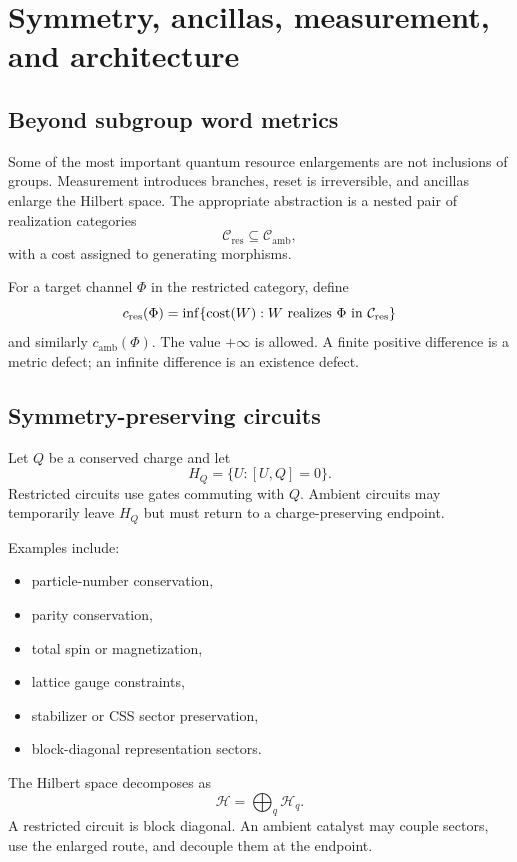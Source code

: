\chapter{Symmetry, ancillas, measurement, and architecture}\label{ch:symmetry-measurement}


\section{Beyond subgroup word metrics}
Some of the most important quantum resource enlargements are not inclusions of groups.  Measurement introduces branches, reset is irreversible, and ancillas enlarge the Hilbert space.  The appropriate abstraction is a nested pair of realization categories
\[
\mathcal C_{\mathrm{res}}
\subseteq
\mathcal C_{\mathrm{amb}},
\]
with a cost assigned to generating morphisms.

For a target channel $\Phi$ in the restricted category, define
\[
c_{\mathrm{res}}(\Phi)
=
\inf\{\operatorname{cost}(W):W\text{ realizes }\Phi\text{ in }\mathcal C_{\mathrm{res}}\}
\]
and similarly $c_{\mathrm{amb}}(\Phi)$.  The value $+\infty$ is allowed.  A finite positive difference is a metric defect; an infinite difference is an existence defect.

\section{Symmetry-preserving circuits}
Let $Q$ be a conserved charge and let
\[
H_Q=\{U:[U,Q]=0\}.
\]
Restricted circuits use gates commuting with $Q$.  Ambient circuits may temporarily leave $H_Q$ but must return to a charge-preserving endpoint.

Examples include:
\begin{itemize}
\item particle-number conservation,
\item parity conservation,
\item total spin or magnetization,
\item lattice gauge constraints,
\item stabilizer or CSS sector preservation,
\item block-diagonal representation sectors.
\end{itemize}

The Hilbert space decomposes as
\[
\mathcal H=\bigoplus_q\mathcal H_q.
\]
A restricted circuit is block diagonal.  An ambient catalyst may couple sectors, use the enlarged route, and decouple them at the endpoint.

